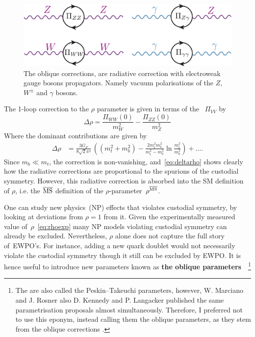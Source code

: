 \begin{figure}[htpb!]
	\centering
	\includegraphics[width=0.75\linewidth]{./figures/oblique_corrections}
	\caption{The oblique corrections, are radiative correction with electroweak gauge bosons propagators. Namely vacuum polarisations of the $Z$, $W^\pm$ and $\gamma$ bosons. }  \label{fig:oblique}
\end{figure}
The 1-loop correction to the $\rho$ parameter is given in terms of the ~$\Pi_{VV}$  by
\begin{equation}
\Delta \rho = \frac{\Pi_{WW}(0)}{m_W^2}- \frac{\Pi_{ZZ}(0)}{m_Z^2}
\end{equation}
Where the dominant contributions are given by~\cite{EINHORN1981146}
\begin{align}
\Delta \rho & = \frac{3 G_F}{8\sqrt{2}\pi^2}\,\left((m_t^2+m_b^2)-\frac{2m_t^2m_b^2}{m_t^2-m_b^2}\ln \frac{m_t^2}{m_b^2} \right)+\dots.
\label{eq:deltarho}
\end{align}
Since $m_b\ll m_t$, the correction is non-vanishing, and~\eqref{eq:deltarho} shows clearly how the radiative corrections are proportional to the spurions of the custodial symmetry. However, this radiative correction is absorbed into the SM definition of $\rho$, i.e. the $\overline{\mathrm{MS}}$ definition of the $\rho$-parameter~$\rho^{\overline{\mathrm{MS}}}$.
\par One can study  new physics~(NP) effects that violates custodial symmetry, by looking at deviations from $\rho=1$ from it. Given the experimentally measured value of~$\rho$~\eqref{eq:rhoexp} many NP models violating custodial symmetry can already be excluded. Nevertheless, $\rho$ alone does not capture the full story of~EWPO's. For instance, adding a new quark doublet would not necessarily violate the custodial symmetry though it still can be excluded by EWPO. It is hence useful to introduce new parameters known as \textbf{ the oblique parameters}~\cite{PhysRevLett.65.2963,PhysRevLett.65.964,PhysRevLett.66.395.2,Peskin91estimationof,peskin1995introduction}~\footnote{The are also called the Peskin–Takeuchi parameters, however, W. Marciano and J. Rosner also D. Kennedy and P. Langacker published the same parametrisation proposals almost simultaneously. Therefore, I preferred not to use this eponym, instead calling them the oblique parameters, as they stem from the oblique corrections .}
